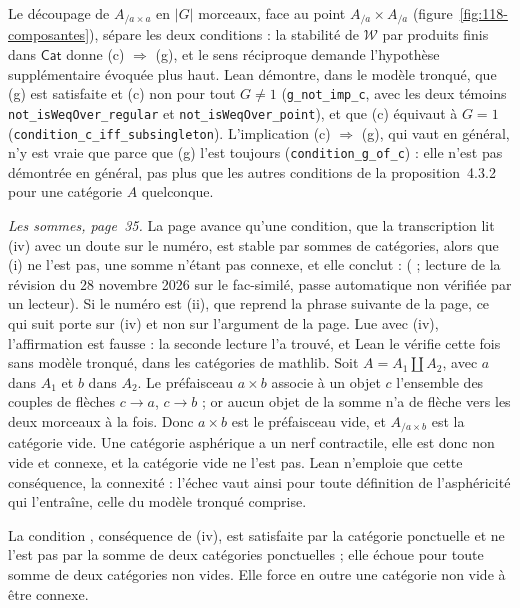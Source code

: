 Le découpage de $A_{/a \times a}$ en $|G|$ morceaux, face au point $A_{/a} \times A_{/a}$ (figure~\ref{fig:118-composantes}), sépare les deux conditions : la stabilité de $\mathcal W$ par produits finis dans $\mathsf{Cat}$ donne (c) $\Rightarrow$ (g), et le sens réciproque demande l'hypothèse supplémentaire évoquée plus haut. Lean démontre, dans le modèle tronqué, que (g) est satisfaite et (c) non pour tout $G \neq 1$ (\texttt{g\_not\_imp\_c}, avec les deux témoins \texttt{not\_isWeqOver\_regular} et \texttt{not\_isWeqOver\_point}), et que (c) équivaut à $G = 1$ (\texttt{condition\_c\_iff\_subsingleton}). L'implication (c) $\Rightarrow$ (g), qui vaut en général, n'y est vraie que parce que (g) l'est toujours (\texttt{condition\_g\_of\_c}) : elle n'est pas démontrée en général, pas plus que les autres conditions de la proposition~4.3.2 pour une catégorie $A$ quelconque.

\noindent\emph{Les sommes, page~35.} La page avance qu'une condition, que la transcription lit (iv) avec un doute sur le numéro, est  stable par sommes de catégories, alors que (i) ne l'est pas, une somme n'étant pas connexe, et elle conclut :  ( ; lecture de la révision du 28 novembre 2026 sur le fac-similé, passe automatique non vérifiée par un lecteur). Si le numéro est (ii), que reprend la phrase suivante de la page, ce qui suit porte sur (iv) et non sur l'argument de la page. Lue avec (iv), l'affirmation est fausse : la seconde lecture l'a trouvé, et Lean le vérifie cette fois sans modèle tronqué, dans les catégories de mathlib. Soit $A = A_1 \amalg A_2$, avec $a$ dans $A_1$ et $b$ dans $A_2$. Le préfaisceau $a \times b$ associe à un objet $c$ l'ensemble des couples de flèches $c \to a$, $c \to b$ ; or aucun objet de la somme n'a de flèche vers les deux morceaux à la fois. Donc $a \times b$ est le préfaisceau vide, et $A_{/a \times b}$ est la catégorie vide. Une catégorie asphérique a un nerf contractile, elle est donc non vide et connexe, et la catégorie vide ne l'est pas. Lean n'emploie que cette conséquence, la connexité : l'échec vaut ainsi pour toute définition de l'asphéricité qui l'entraîne, celle du modèle tronqué comprise.

\begin{encadre}
\begin{contrexemple}
La condition , conséquence de (iv), est satisfaite par la catégorie ponctuelle et ne l'est pas par la somme de deux catégories ponctuelles ; elle échoue pour toute somme de deux catégories non vides. Elle force en outre une catégorie non vide à être connexe.
\end{contrexemple}
\end{encadre}

